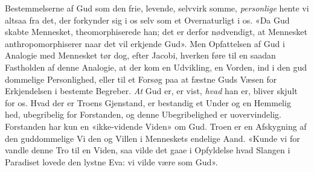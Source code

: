 \documentclass[12pt,a4paper]{book}
\begin{document}
Bestemmelserne af Gud som den frie, levende, selvvirk\-%
somme, \emph{personlige} hente vi altsaa fra det, der forkynder
sig i os selv som et Overnaturligt i os. «Da Gud skabte
Mennesket, theomorphiserede han; det er derfor nødvendigt,
at Mennesket anthropomorphiserer naar det vil erkjende Gud».
Men Opfattelsen af Gud i Analogie med Mennesket tør dog,
efter Jacobi, hverken føre til en saadan Fastholden af denne
Analogie, at der kom en Udvikling, en Vorden, ind i den gud\-%
dommelige Personlighed, eller til et Forsøg paa at fæstne
Guds Væsen for Erkjendelsen i bestemte Begreber. \emph{At} Gud
er, er vist, \emph{hvad} han er, bliver skjult for os. Hvad der
er Troens Gjenstand, er bestandig et Under og en Hemmelig\-%
hed, ubegribelig for Forstanden, og denne Ubegribelighed er
uovervindelig. Forstanden har kun en «ikke-vidende Viden»
om Gud. Troen er en Afskygning af den guddommelige Vi\-%
den og Villen i Menneskets endelige Aand. «Kunde vi for\-%
vandle denne Tro til en Viden, saa vilde det gaae i Opfyldelse
hvad Slangen i Paradiset lovede den lystne Eva: vi vilde være
som Gud».
\end{document}
